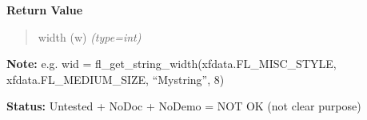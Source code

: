 \begin{boxedminipage}{\funcwidth}
\begin{quote}
      \end{quote}

      \textbf{Return Value}
    \vspace{-1ex}

      \begin{quote}

width (w)
      {\it (type=int)}

      \end{quote}

\textbf{Note:} 
e.g. wid = fl\_get\_string\_width(xfdata.FL\_MISC\_STYLE,
xfdata.FL\_MEDIUM\_SIZE, ``Mystring'', 8)


\textbf{Status:} 
Untested + NoDoc + NoDemo = NOT OK (not clear purpose)


    \end{boxedminipage}

    \label{xformslib:flbasic:fl_get_string_dimension}

    \vspace{0.5ex}

